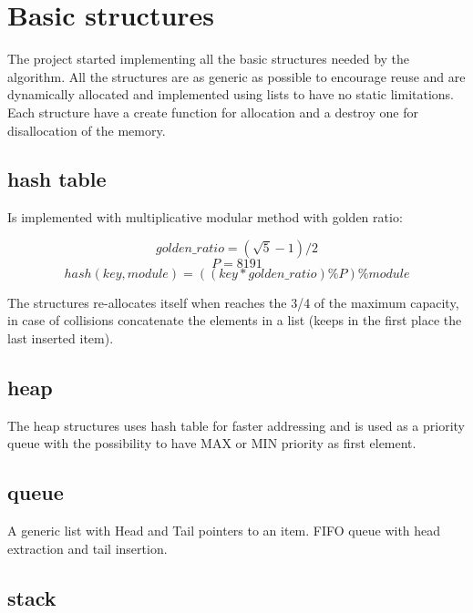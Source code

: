 \section{Basic structures}
\label{Sec:basic_structures}

The project started implementing all the basic structures needed by the algorithm. All the structures are as generic as possible to encourage reuse and are dynamically allocated and implemented using lists to have no static limitations. \\
Each structure have a create function for allocation and a destroy one for disallocation of the memory.

\subsection{hash table}
\label{hash_table}

Is implemented with multiplicative modular method with golden ratio:

\begin{equation}
    golden\_ratio = (\sqrt{5} - 1)/2
\end{equation}
\begin{equation}
    P = 8191
\end{equation}
\begin{equation}
    hash(key, module) = ((key*golden\_ratio)\%P)\%module
\end{equation}

The structures re-allocates itself when reaches the 3/4 of the maximum capacity, in case of collisions concatenate the elements in a list (keeps in the first place the last inserted item).

\subsection{heap}
\label{heap}

The heap structures uses hash table for faster addressing and is used as a priority queue with the possibility to have MAX or MIN priority as first element.

\subsection{queue}

A generic list with Head and Tail pointers to an item. FIFO queue with head extraction and tail insertion.

\subsection{stack}
\label{stack}

